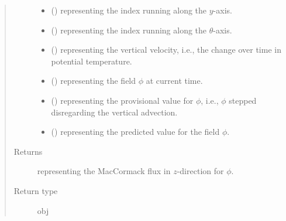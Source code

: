 \documentclass[letterpaper,10pt,english]{sphinxmanual}
\begin{document}
\begin{fulllineitems}
\begin{fulllineitems}
\begin{quote}
\begin{description}
\begin{itemize}
\item {} 
 () \textendash{}  representing the index running along the \(y\)-axis.

\item {} 
 () \textendash{}  representing the index running along the \(\theta\)-axis.

\item {} 
 () \textendash{}  representing the vertical velocity, i.e., the change over time in potential temperature.

\item {} 
 () \textendash{}  representing the field \(\phi\) at current time.

\item {} 
 () \textendash{}  representing the provisional value for \(\phi\), i.e., \(\phi\) stepped disregarding
the vertical advection.

\item {} 
 () \textendash{}  representing the predicted value for the field \(\phi\).

\end{itemize}

\item[{Returns}] \leavevmode
{} representing the MacCormack flux in \(z\)-direction for \(\phi\).

\item[{Return type}] \leavevmode
obj

\end{description}\end{quote}

\end{fulllineitems}



\end{fulllineitems}
\end{document}
